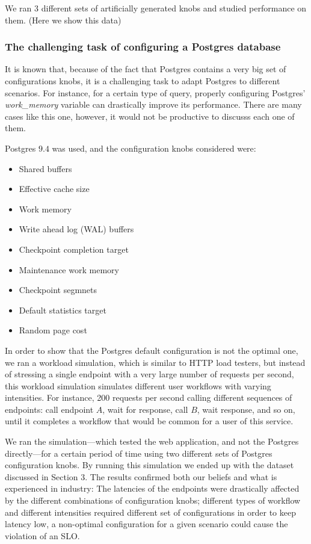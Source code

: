 We ran 3 different sets of artificially generated knobs and studied \projectname{} performance on them. (Here we show this data)

\subsubsection{The challenging task of configuring a Postgres database}

It is known that, because of the fact that Postgres contains a very big set of configurations knobs, it is a challenging task to adapt Postgres to different scenarios. For instance, for a certain type of query, properly configuring Postgres' \textit{work\_memory} variable can drastically improve its performance. There are many cases like this one, however, it would not be productive to discusss each one of them.

Postgres $9.4$ was used, and the configuration knobs considered were:

\begin{itemize}
  \item Shared buffers
  \item Effective cache size
  \item Work memory
  \item Write ahead log (WAL) buffers
  \item Checkpoint completion target
  \item Maintenance work memory
  \item Checkpoint segmnets
  \item Default statistics target
  \item Random page cost
\end{itemize}

In order to show that the Postgres default configuration is not the optimal one, we ran a workload simulation, which is similar to HTTP load testers, but instead of stressing a single endpoint with a very large number of requests per second, this workload simulation simulates different user workflows with varying intensities. For instance, 200 requests per second calling different sequences of endpoints: call endpoint $A$, wait for response, call $B$, wait response, and so on, until it completes a workflow that would be common for a user of this service. 

We ran the simulation---which tested the web application, and not the Postgres directly---for a certain period of time using two different sets of Postgres configuration knobs. By running this simulation we ended up with the dataset discussed in Section 3. The results confirmed both our beliefs and what is experienced in industry: The latencies of the endpoints were drastically affected by the different combinations of configuration knobs; different types of workflow and different intensities required different set of configurations in order to keep latency low, a non-optimal configuration for a given scenario could cause the violation of an SLO.

